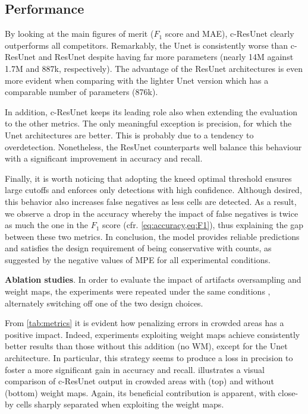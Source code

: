 \subsection{Performance}

By looking at the main figures of merit ($F_1$ score and MAE), c-ResUnet clearly outperforms all competitors.
Remarkably, the Unet is consistently worse than c-ResUnet and ResUnet despite having far more parameters (nearly 14M against 1.7M and 887k, respectively).
The advantage of the ResUnet architectures is even more evident when comparing with the lighter Unet version which has a comparable number of parameters (876k).

In addition, c-ResUnet keeps its leading role also when extending the evaluation to the other metrics.
The only meaningful exception is precision, for which the Unet architectures are better. This is probably due to a tendency to overdetection. 
Nonetheless, the ResUnet counterparts well balance this behaviour with a significant improvement in accuracy and recall.

Finally, it is worth noticing that adopting the kneed optimal threshold ensures large cutoffs and enforces only detections with high confidence.
Although desired, this behavior also increases false negatives as less cells are detected. 
As a result, we observe a drop in the accuracy whereby the impact of false negatives is twice as much the one in the $F_1$ score (cfr. \cref{eq:accuracy,eq:F1}), thus explaining the gap between these two metrics.
In conclusion, the model provides reliable predictions and satisfies the design requirement of being conservative with counts, as suggested by the negative values of MPE for all experimental conditions.

\noindent\textbf{Ablation studies}.
In order to evaluate the impact of artifacts oversampling and weight maps, the experiments were repeated under the same conditions%
, alternately switching off one of the two design choices.

From \cref{tab:metrics} it is evident how penalizing errors in crowded areas has a positive impact. Indeed, experiments exploiting weight maps achieve consistently better results than those without this addition (no WM), except for the Unet architecture.  
In particular, this strategy seems to produce a loss in precision to foster a more significant gain in accuracy and recall.
 illustrates a visual comparison of c-ResUnet output in crowded areas with (top) and without (bottom) weight maps. 
Again, its beneficial contribution is apparent, with close-by cells sharply separated when exploiting the weight maps.

